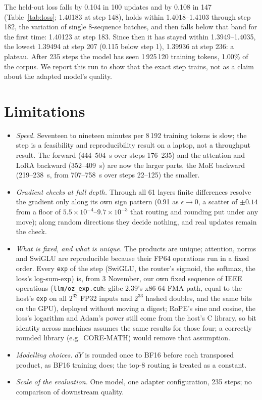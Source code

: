 \documentclass[11pt]{article}
\begin{document}
The held-out loss falls by 0.104 in 100 updates and by 0.108 in 147 (Table~\ref{tab:loss}; 1.40183 at step 148), holds
within 1.4018--1.4103 through step 182, the variation of single 8-sequence batches, and then falls below that band for the
first time: 1.40123 at step 183. Since then it has stayed within 1.3949--1.4035, the lowest 1.39494 at step 207 (0.115 below step 1),
1.39936 at step 236: a plateau. After 235 steps the model has seen 1\,925\,120 training tokens, 1.00\% of the corpus. We report this run to show that the exact step trains, not as a claim
about the adapted model's quality.

\section{Limitations}
\begin{itemize}
\item \emph{Speed.} Seventeen to nineteen minutes per 8\,192 training tokens is slow; the step is a feasibility
and reproducibility result on a laptop, not a throughput result. The forward (444--504~s over steps 176--235) and the
attention and LoRA backward (352--409~s) are now the larger parts, the MoE backward (219--238~s, from 707--758~s over
steps 22--125) the smaller.
\item \emph{Gradient checks at full depth.} Through all 61 layers finite differences resolve the gradient only along its
own sign pattern (0.91 as $\epsilon\to0$, a scatter of $\pm0.14$ from a floor of $5.5\times10^{-4}$--$9.7\times10^{-3}$ that
routing and rounding put under any move); along random directions they decide nothing, and real updates remain the check.
\item \emph{What is fixed, and what is unique.} The products are unique; attention, norms and SwiGLU are reproducible
because their FP64 operations run in a fixed order. Every \texttt{exp} of the step (SwiGLU, the router's sigmoid, the
softmax, the loss's log-sum-exp) is,
from 3 November, our own fixed sequence of IEEE operations (\texttt{llm/oz\_exp.cuh}: glibc 2.39's x86-64 FMA path, equal to
the host's \texttt{exp} on all $2^{32}$ FP32 inputs and $2^{33}$ hashed doubles, and the same bits on the GPU), deployed
without moving a digest; RoPE's sine and cosine, the loss's logarithm and Adam's power still come from the host's C library,
so bit identity across machines assumes the same results for those four; a correctly rounded library (e.g.\ CORE-MATH)
would remove that assumption.
\item \emph{Modelling choices.} $dY$ is rounded once to BF16 before each transposed product, as BF16 training does; the
top-8 routing is treated as a constant.
\item \emph{Scale of the evaluation.} One model, one adapter configuration, 235 steps; no comparison of downstream quality.
\end{itemize}
\end{document}
